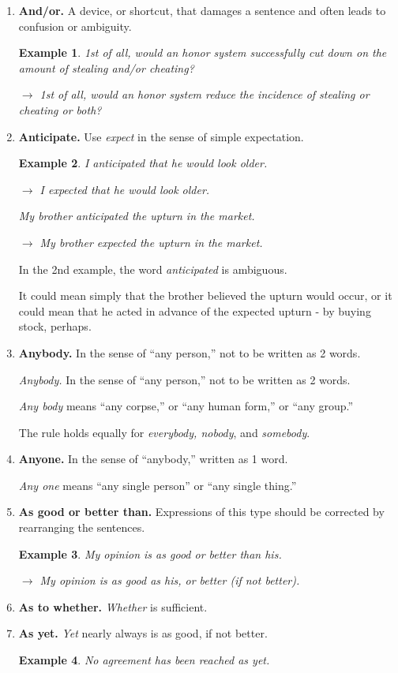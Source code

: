 \documentclass{article}
\newtheorem{example}{Example}
\begin{document}
\begin{enumerate}
	When, however, more than 2 are involved but each is considered  individually, {\it between} is preferred: ``an agreement between the 6 heirs.''
	\item {\bf And/or.} A device, or shortcut, that damages a sentence and often leads to confusion or ambiguity.
	\begin{example}
		1st of all, would an honor system successfully cut down on the amount of stealing and/or cheating?
		
		$\to$ 1st of all, would an honor system reduce the incidence of stealing or cheating or both?
	\end{example}
	\item {\bf Anticipate.} Use {\it expect} in the sense of simple expectation.
	\begin{example}
		I anticipated that he would look older.
		
		$\to$ I expected that he would look older.
		
		My brother anticipated the upturn in the market.
		
		$\to$ My brother expected the upturn in the market.
	\end{example}
	In the 2nd example, the word {\it anticipated} is ambiguous.
	
	It could mean simply that the brother believed the upturn would occur, or it could mean that he acted in advance of the expected upturn - by buying stock, perhaps.
	\item {\bf Anybody.} In the sense of ``any person,'' not to be written as 2 words.
	
	{\it Anybody.} In the sense of ``any person,'' not to be written as 2 words.
	
	{\it Any body} means ``any corpse,'' or ``any human form,'' or ``any group.''
	
	The rule holds equally for {\it everybody, nobody}, and {\it somebody}.
	\item {\bf Anyone.} In the sense of ``anybody,'' written as 1 word.
	
	{\it Any one} means ``any single person'' or ``any single thing.''
	\item {\bf As good or better than.} Expressions of this type should be corrected by rearranging the sentences.
	\begin{example}
		My opinion is as good or better than his.
		
		$\to$ My opinion is as good as his, or better (if not better).
	\end{example}
	\item {\bf As to whether.} {\it Whether} is sufficient.
	\item {\bf As yet.} {\it Yet} nearly always is as good, if not better.
	\begin{example}
		No agreement has been reached as yet.
		

\end{example}
\end{enumerate}
\end{document}
